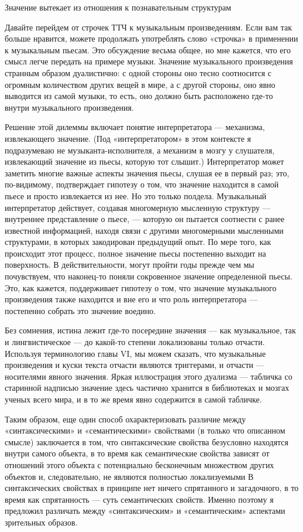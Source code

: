 \documentclass[../main.tex]{subfiles}
\begin{document}
Значение вытекает из отношения к познавательным структурам

Давайте перейдем от строчек ТТЧ к музыкальным произведениям. Если вам так больше нравится, можете продолжать употреблять слово «строчка» в применении к музыкальным пьесам. Это обсуждение весьма общее, но мне кажется, что его смысл легче передать на примере музыки. Значение музыкального произведения странным образом дуалистично: с одной стороны оно тесно соотносится с огромным количеством других вещей в мире, а с другой стороны, оно явно выводится из самой музыки, то есть, оно должно быть расположено где-то внутри музыкального произведения.

Решение этой дилеммы включает понятие интерпретатора --- механизма, извлекающего значение. (Под «интерпретатором» в этом контексте я подразумеваю не музыканта-исполнителя, а механизм в мозгу у слушателя, извлекающий значение из пьесы, которую тот слышит.) Интерпретатор может заметить многие важные аспекты значения пьесы, слушая ее в первый раз; это, по-видимому, подтверждает гипотезу о том, что значение находится в самой пьесе и просто извлекается из нее. Но это только полдела. Музыкальный интерпретатор действует, создавая многомерную мысленную структуру --- внутреннее представление о пьесе, --- которую он пытается соотнести с ранее известной информацией, находя связи с другими многомерными мысленными структурами, в которых закодирован предыдущий опыт. По мере того, как происходит этот процесс, полное значение пьесы постепенно выходит на поверхность. В действительности, могут пройти годы прежде чем мы почувствуем, что наконец-то поняли сокровенное значение определенной пьесы. Это, как кажется, поддерживает гипотезу о том, что значение музыкального произведения также находится и вне его и что роль интерпретатора --- постепенно собрать это значение воедино.

Без сомнения, истина лежит где-то посередине значения --- как музыкальное, так и лингвистическое --- до какой-то степени локализованы только отчасти. Используя терминологию главы VI, мы можем сказать, что музыкальные произведения и куски текста отчасти являются триггерами, и отчасти --- носителями явного значения. Яркая иллюстрация этого дуализма --- табличка со старинной надписью значение здесь частично хранится в библиотеках и мозгах ученых всего мира, и в то же время явно содержится в самой табличке.

Таким образом, еще один способ охарактеризовать различие между «синтаксическими» и «семантическими» свойствами (в только что описанном смысле) заключается в том, что синтаксические свойства безусловно находятся внутри самого объекта, в то время как семантические свойства зависят от отношений этого объекта с потенциально бесконечным множеством других объектов и, следовательно, не являются полностью локализуемыми В синтаксических свойствах в принципе нет ничего спрятанного и загадочного, в то время как спрятанность --- суть семантических свойств. Именно поэтому я предложил различать между «синтаксическим» и «семантическим» аспектами зрительных образов.
\end{document}
